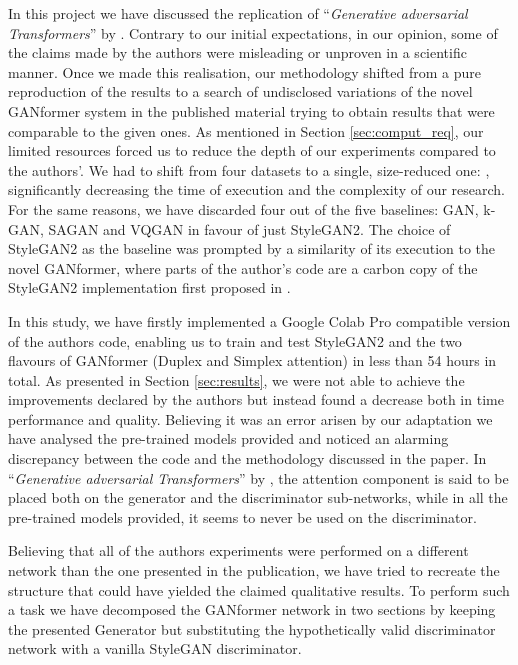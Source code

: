 \documentclass{article}
\begin{document}
In this project we have discussed the replication of ``\emph{Generative adversarial Transformers}'' 
by 
\citet{hudson2021generative}.
Contrary to our initial expectations, in our opinion, some of the claims made by the authors were 
misleading or unproven in a scientific manner.
Once we made this realisation, our methodology shifted from a pure reproduction of the results to a 
search of undisclosed variations of the novel GANformer system in the published material trying to 
obtain 
results that were comparable to the given ones.
As mentioned in Section \ref{sec:comput_req}, our limited resources forced us to reduce the depth 
of our experiments 
compared to the authors'.
We had to shift from four datasets to a single, size-reduced one: \citet{cartoonset}, significantly 
decreasing the time of execution and the complexity of our research.
For the same reasons, we have discarded four out of the five baselines: GAN, k-GAN, SAGAN and 
VQGAN 
in favour of just StyleGAN2.
The choice of StyleGAN2 as the baseline was prompted by a similarity of its execution to the novel 
GANformer, where parts of the author's code are a carbon copy of the StyleGAN2 implementation 
first 
proposed in \citet{karras2019style}.

In this study, we have firstly implemented a Google Colab Pro compatible version of the authors 
code, 
enabling us to train and test StyleGAN2 and the two flavours of GANformer (Duplex and Simplex 
attention) 
in less than 54 hours in total.
As presented in Section \ref{sec:results}, we were not able to achieve the improvements declared by 
the authors but instead 
found a decrease both in time performance and quality.
Believing it was an error arisen by our adaptation we have analysed the pre-trained models provided 
and 
noticed an alarming discrepancy between the code and the methodology discussed in the paper.
In ``\emph{Generative adversarial Transformers}'' by \citet{hudson2021generative}, the attention 
component 
is said to be placed both on the generator and the discriminator sub-networks, while in all the 
pre-trained 
models provided, it seems to never be used on the discriminator.


Believing that all of the authors experiments were performed on a different network than the one 
presented 
in the publication, we have tried to recreate the structure that could have yielded the claimed 
qualitative results.
To perform such a task we have decomposed the GANformer network in two sections by keeping 
the presented 
Generator but substituting the hypothetically valid discriminator network with a vanilla StyleGAN 
discriminator.
\end{document}
